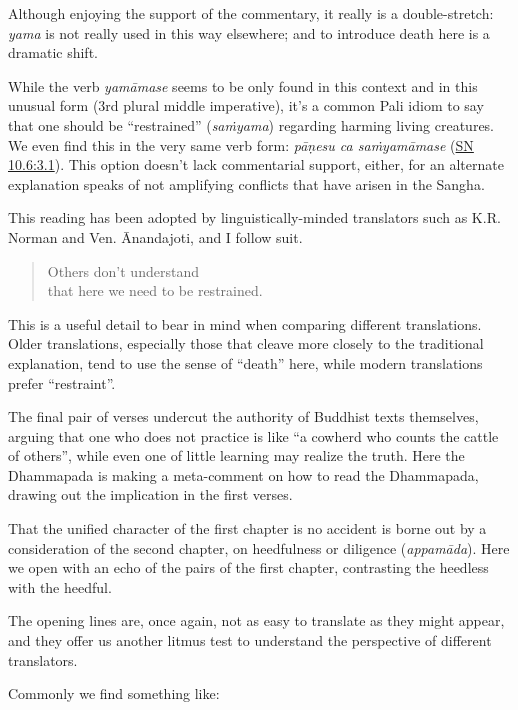 \documentclass[12pt,openany]{book}%
\begin{document}
Although enjoying the support of the commentary, it really is a double-stretch: \textit{yama} is not really used in this way elsewhere; and to introduce death here is a dramatic shift.

While the verb \textit{\textsanskrit{yamāmase}}  seems to be only found in this context and in this unusual form (3rd plural middle imperative), it’s a common Pali idiom to say that one should be “restrained” (\textit{\textsanskrit{saṁyama}}) regarding harming living creatures. We even find this in the very same verb form: \textit{\textsanskrit{pāṇesu} ca \textsanskrit{saṁyamāmase}} (\href{https://suttacentral.net/sn10.6/en/sujato\#3.1}{SN 10.6:3.1}). This option doesn’t lack commentarial support, either, for an alternate explanation speaks of not amplifying conflicts that have arisen in the Sangha.

This reading has been adopted by linguistically-minded translators such as K.R. Norman and Ven. Ānandajoti, and I follow suit.

\begin{verse}%
Others don’t understand \\
that here we need to be restrained.

%
\end{verse}

This is a useful detail to bear in mind when comparing different translations. Older translations, especially those that cleave more closely to the traditional explanation, tend to use the sense of “death” here, while modern translations prefer “restraint”.

The final pair of verses undercut the authority of Buddhist texts themselves, arguing that one who does not practice is like “a cowherd who counts the cattle of others”, while even one of little learning may realize the truth. Here the Dhammapada is making a meta-comment on how to read the Dhammapada, drawing out the implication in the first verses.

That the unified character of the first chapter is no accident is borne out by a consideration of the second chapter, on heedfulness or diligence (\textit{\textsanskrit{appamāda}}). Here we open with an echo of the pairs of the first chapter, contrasting the heedless with the heedful.

The opening lines are, once again, not as easy to translate as they might appear, and they offer us another litmus test to understand the perspective of different translators.

Commonly we find something like:
\end{document}
